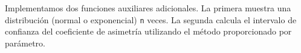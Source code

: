 \documentclass[a4paper]{article}
\begin{document}
Implementamos dos funciones auxiliares adicionales. La primera muestra
una distribución (normal o exponencial) \texttt{n} veces. La segunda
calcula el intervalo de confianza del coeficiente de asimetría
utilizando el método proporcionado por parámetro.

\begin{Shaded}
	\begin{Highlighting}[]
\StringTok{ }
\OperatorTok{==}\NormalTok{) \{}
\NormalTok{, }\NormalTok{)}
\NormalTok{  \} } \OperatorTok{==}\NormalTok{) \{}
\NormalTok{)}
\NormalTok{  \} }\NormalTok{ \{}
\NormalTok{(}\NormalTok{)}
\NormalTok{  \}}
\NormalTok{\}}


\end{Highlighting}
\end{Shaded}
\end{document}

